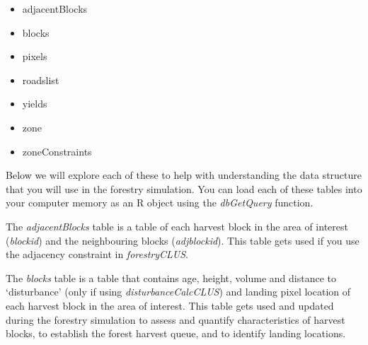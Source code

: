 \documentclass[
]{article}
\providecommand{\tightlist}{%
  \setlength{\itemsep}{0pt}\setlength{\parskip}{0pt}}
\begin{document}
\begin{itemize}
\tightlist
\item
  adjacentBlocks\\
\item
  blocks\\
\item
  pixels\\
\item
  roadslist\\
\item
  yields\\
\item
  zone\\
\item
  zoneConstraints
\end{itemize}

Below we will explore each of these to help with understanding the data
structure that you will use in the forestry simulation. You can load
each of these tables into your computer memory as an R object using the
\emph{dbGetQuery} function.

The \emph{adjacentBlocks} table is a table of each harvest block in the
area of interest (\emph{blockid}) and the neighbouring blocks
(\emph{adjblockid}). This table gets used if you use the adjacency
constraint in \emph{forestryCLUS}.

The \emph{blocks} table is a table that contains age, height, volume and
distance to `disturbance' (only if using \emph{disturbanceCalcCLUS}) and
landing pixel location of each harvest block in the area of interest.
This table gets used and updated during the forestry simulation to
assess and quantify characteristics of harvest blocks, to establish the
forest harvest queue, and to identify landing locations.
\end{document}
